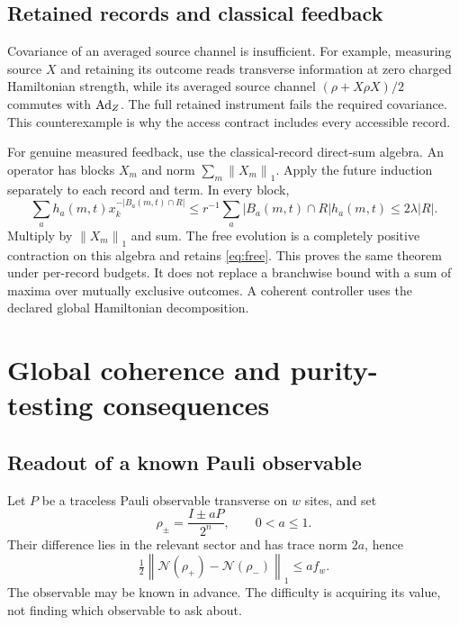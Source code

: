 \documentclass[11pt,a4paper]{article}
\newcommand{\norm}[1]{\left\lVert #1\right\rVert}
\newcommand{\calN}{\mathcal N}\newcommand{\calU}{\mathcal U}\newcommand{\calV}{\mathcal V}
\begin{document}
\subsection{Retained records and classical feedback}

Covariance of an averaged source channel is insufficient. For example, measuring source $X$ and retaining its outcome reads transverse information at zero charged Hamiltonian strength, while its averaged source channel $(\rho+X\rho X)/2$ commutes with $\operatorname{Ad}_Z$. The full retained instrument fails the required covariance. This counterexample is why the access contract includes every accessible record.

For genuine measured feedback, use the classical-record direct-sum algebra. An operator has blocks $X_m$ and norm $\sum_m\norm{X_m}_1$. Apply the future induction separately to each record and term. In every block,
\begin{equation}
\sum_a h_a(m,t)x_k^{-|B_a(m,t)\cap R|}
\le r^{-1}\sum_a |B_a(m,t)\cap R|h_a(m,t)\le2\lambda|R|.
\end{equation}
Multiply by $\norm{X_m}_1$ and sum. The free evolution is a completely positive contraction on this algebra and retains \eqref{eq:free}. This proves the same theorem under per-record budgets. It does not replace a branchwise bound with a sum of maxima over mutually exclusive outcomes. A coherent controller uses the declared global Hamiltonian decomposition.

\section{Global coherence and purity-testing consequences}

\subsection{Readout of a known Pauli observable}
Let $P$ be a traceless Pauli observable transverse on $w$ sites, and set
\begin{equation}
\rho_\pm=\frac{I\pm aP}{2^n},\qquad0<a\le1.
\end{equation}
Their difference lies in the relevant sector and has trace norm $2a$, hence
\begin{equation}
\tfrac12\norm{\calN(\rho_+)-\calN(\rho_-)}_1\le a f_w.
\end{equation}
The observable may be known in advance. The difficulty is acquiring its value, not finding which observable to ask about.
\end{document}
